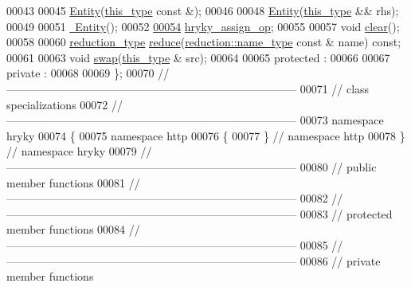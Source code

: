 \begin{DoxyCode}
00043 
00045     \hyperlink{classhryky_1_1http_1_1_entity_add41c964efc3356d4606780b1533bc67}{Entity}(\hyperlink{classhryky_1_1http_1_1_entity}{this_type} \textcolor{keyword}{const} &);
00046 
00048     \hyperlink{classhryky_1_1http_1_1_entity_add41c964efc3356d4606780b1533bc67}{Entity}(\hyperlink{classhryky_1_1http_1_1_entity}{this_type} && rhs);
00049 
00051     \hyperlink{classhryky_1_1http_1_1_entity_ad2c0b249a677a567d58eeb6dfc4f70e2}{~Entity}();
00052 
\hypertarget{http__entity_8h_source_l00054}{}\hyperlink{classhryky_1_1http_1_1_entity_a955969f57e5993834f98157253cf0268}{00054}     \hyperlink{classhryky_1_1http_1_1_entity_a955969f57e5993834f98157253cf0268}{hryky_assign_op};
00055 
00057     \textcolor{keywordtype}{void} \hyperlink{classhryky_1_1http_1_1_entity_a406ce4d583802b9a66838047fbfd75bf}{clear}();
00058 
00060     \hyperlink{classhryky_1_1_intrusive_ptr}{reduction_type} \hyperlink{classhryky_1_1http_1_1_entity_a26762cbd1f41f76053dd5aa9a14605d2}{reduce}(\hyperlink{classhryky_1_1reduction_1_1_string}{reduction::name_type} \textcolor{keyword}{const} & name) \textcolor{keyword}{const};
00061 
00063     \textcolor{keywordtype}{void} \hyperlink{classhryky_1_1http_1_1_entity_a9b87d22f99398a3754c3087202969c3f}{swap}(\hyperlink{classhryky_1_1http_1_1_entity}{this_type} & src);
00064 
00065 \textcolor{keyword}{protected} :
00066 
00067 \textcolor{keyword}{private} :
00068 
00069 \};
00070 \textcolor{comment}{//
      ------------------------------------------------------------------------------}
00071 \textcolor{comment}{// class specializations}
00072 \textcolor{comment}{//
      ------------------------------------------------------------------------------}
00073 \textcolor{keyword}{namespace }hryky
00074 \{
00075 \textcolor{keyword}{namespace }http
00076 \{
00077 \} \textcolor{comment}{// namespace http}
00078 \} \textcolor{comment}{// namespace hryky}
00079 \textcolor{comment}{//
      ------------------------------------------------------------------------------}
00080 \textcolor{comment}{// public member functions}
00081 \textcolor{comment}{//
      ------------------------------------------------------------------------------}
00082 \textcolor{comment}{//
      ------------------------------------------------------------------------------}
00083 \textcolor{comment}{// protected member functions}
00084 \textcolor{comment}{//
      ------------------------------------------------------------------------------}
00085 \textcolor{comment}{//
      ------------------------------------------------------------------------------}
00086 \textcolor{comment}{// private member functions}

\end{DoxyCode}
